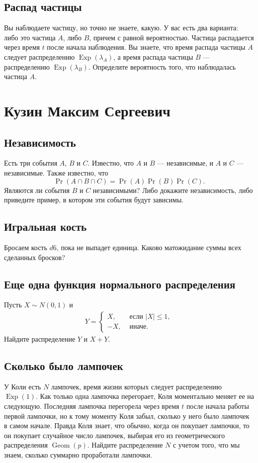 \documentclass[12pt]{article}
\DeclareMathOperator{\Geom}{Geom}
\DeclareMathOperator{\Exp}{Exp}
\begin{document}
\subsection{Распад частицы}
Вы наблюдаете частицу, но точно не знаете, какую. У вас есть два варианта: либо это частица $A$, либо $B$, причем с равной вероятностью. Частица распадается через время $t$ после начала наблюдения. Вы знаете, что время распада частицы $A$ следует распределению $\Exp(\lambda_A)$, а время распада частицы $B$ --- распределению $\Exp(\lambda_B)$. Определите вероятность того, что наблюдалась частица $A$.

\newpage
\section{Кузин Максим Сергеевич}

\subsection{Независимость}
Есть три события $A$, $B$ и $C$. Известно, что $A$ и $B$ --- независимые, и $A$ и $C$ --- независимые. Также известно, что \[\Pr(A \cap B \cap C) = \Pr(A)\Pr(B)\Pr(C).\] Являются ли события $B$ и $C$ независимыми? Либо докажите независимость, либо приведите пример, в котором эти события будут зависимы.

\subsection{Игральная кость}Бросаем кость $d6$, пока не выпадет единица. Каково матожидание суммы всех сделанных бросков?

\subsection{Еще одна функция нормального распределения}
Пусть $X \sim N(0, 1)$ и 
\begin{align*}
    Y = \begin{cases}
        X, &\text{ если } |X| \le 1, \\
        -X, &\text{ иначе.}
    \end{cases}
\end{align*}
Найдите распределение $Y$ и $X + Y$.

\subsection{Сколько было лампочек}
У Коли есть $N$ лампочек, время жизни которых следует распределению $\Exp(1)$. Как только одна лампочка перегорает, Коля моментально меняет ее на следующую. Последняя лампочка перегорела через время $t$ после начала работы первой лампочки, но к тому моменту Коля забыл, сколько у него было лампочек в самом начале. Правда Коля знает, что обычно, когда он покупает лампочки, то он покупает случайное число лампочек, выбирая его из геометрического распределения $\Geom(p)$. Найдите распределение $N$ с учетом того, что мы знаем, сколько суммарно проработали лампочки. 
\end{document}
